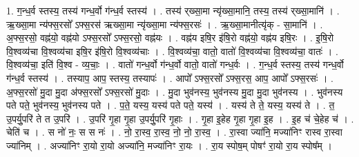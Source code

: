 \documentclass[17pt]{extarticle}
\begin{document}
1. ग॒न्ध॒र्व स्तस्य॒ तस्य॑ गन्ध॒र्वो ग॑न्ध॒र्व स्तस्य॑ । . तस्य॑ र्‌ख्सा॒मा न्यृ॑ख्सा॒मानि॒ तस्य॒ तस्य॑ र्‌ख्सा॒मानि॑ । . ऋ॒ख्सा॒मा न्य॑फ्स॒रसो᳚ ऽफ्स॒रस॑ ऋख्सा॒मा न्यृ॑ख्सा॒मा न्य॑फ्स॒रसः॑ । . ऋ॒ख्सा॒मानीत्यृ॑क् - सा॒मानि॑ । . अ॒फ्स॒रसो॒ वह्न॑यो॒ वह्न॑यो ऽफ्स॒रसो᳚ ऽफ्स॒रसो॒ वह्न॑यः । . वह्न॑य इषि॒र इ॑षि॒रो वह्न॑यो॒ वह्न॑य इषि॒रः । . इ॒षि॒रो वि॒श्वव्य॑चा वि॒श्वव्य॑चा इषि॒र इ॑षि॒रो वि॒श्वव्य॑चाः । . वि॒श्वव्य॑चा॒ वातो॒ वातो॑ वि॒श्वव्य॑चा वि॒श्वव्य॑चा॒ वातः॑ । . वि॒श्वव्य॑चा॒ इति॑ वि॒श्व - व्य॒चाः॒ । . वातो॑ गन्ध॒र्वो ग॑न्ध॒र्वो वातो॒ वातो॑ गन्ध॒र्वः । . ग॒न्ध॒र्व स्तस्य॒ तस्य॑ गन्ध॒र्वो ग॑न्ध॒र्व स्तस्य॑ । . तस्याप॒ आप॒ स्तस्य॒ तस्यापः॑ । . आपो᳚ ऽफ्स॒रसो᳚ ऽफ्स॒रस॒ आप॒ आपो᳚ ऽफ्स॒रसः॑ । . अ॒फ्स॒रसो॑ मु॒दा मु॒दा अ॑फ्स॒रसो᳚ ऽफ्स॒रसो॑ मु॒दाः । . मु॒दा भुव॑नस्य॒ भुव॑नस्य मु॒दा मु॒दा भुव॑नस्य । . भुव॑नस्य पते पते॒ भुव॑नस्य॒ भुव॑नस्य पते । . प॒ते॒ यस्य॒ यस्य॑ पते पते॒ यस्य॑ । . यस्य॑ ते ते॒ यस्य॒ यस्य॑ ते । . त॒ उ॒पर्यु॒परि॑ ते त उ॒परि॑ । . उ॒परि॑ गृ॒हा गृ॒हा उ॒पर्यु॒परि॑ गृ॒हाः । . गृ॒हा इ॒हेह गृ॒हा गृ॒हा इ॒ह । . इ॒ह च॑ चे॒हेह च॑ । . चेति॑ च । . स नो॑ नः॒ स स नः॑ । . नो॒ रा॒स्व॒ रा॒स्व॒ नो॒ नो॒ रा॒स्व॒ । . रा॒स्वा ज्या॑नि॒ मज्या॑निꣳ रास्व रा॒स्वा ज्या॑निम् । . अज्या॑निꣳ रा॒यो रा॒यो अज्या॑नि॒ मज्या॑निꣳ रा॒यः । . रा॒य स्पोष॒म् पोषꣳ॑ रा॒यो रा॒य स्पोष᳚म् । \newline
\end{document}
